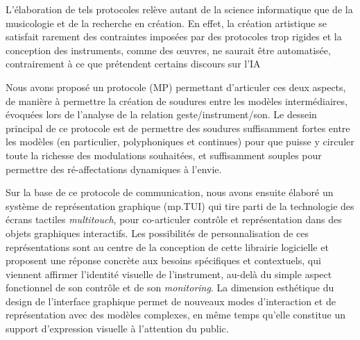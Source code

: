 L'élaboration de tels protocoles relève autant de la science informatique que de la musicologie et de la recherche en création. 
En effet, la création artistique se satisfait rarement des contraintes imposées par des protocoles trop rigides et la conception des instruments, comme des œuvres, ne saurait être automatisée, contrairement à ce que prétendent certains discours sur l'IA



Nous avons proposé un protocole (MP) permettant d'articuler ces deux aspects, de manière à permettre la création de soudures entre les modèles intermédiaires, évoquées lors de l'analyse de la relation geste/instrument/son. Le dessein principal de ce protocole est de permettre des soudures suffisamment fortes entre les modèles (en particulier, polyphoniques et continues) pour que puisse y circuler toute la richesse des modulations souhaitées, et suffisamment souples pour permettre des ré-affectations dynamiques à l'envie.




\noindent Sur la base de ce protocole de communication, nous avons ensuite élaboré un système de représentation graphique (mp.TUI) qui tire parti de la technologie des écrans tactiles \textit{multitouch}, pour co-articuler contrôle et représentation dans des objets graphiques interactifs. Les possibilités de personnalisation de ces représentations sont au centre de la conception de cette librairie logicielle et proposent une réponse concrète aux besoins spécifiques et contextuels, qui viennent affirmer l'identité visuelle de l'instrument, au-delà du simple aspect fonctionnel de son contrôle et de son \textit{monitoring}. La dimension esthétique du design de l'interface graphique permet de nouveaux modes d'interaction et de représentation avec des modèles complexes, en même temps qu'elle constitue un support d'expression visuelle à l'attention du public.

